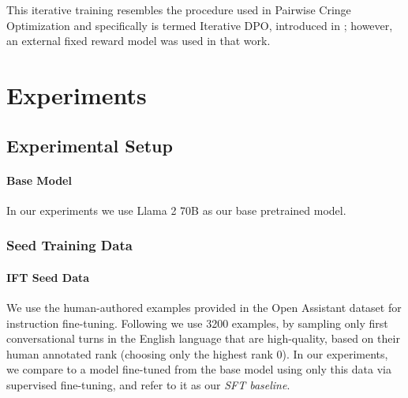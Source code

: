 \documentclass{article}
\begin{document}
This iterative training resembles the procedure used in Pairwise Cringe Optimization and specifically is termed  Iterative DPO,  introduced in \citet{xu2023some}; however, an external fixed reward model was used in that work.


\section{Experiments}

\subsection{Experimental Setup}

\paragraph{Base Model}
In our experiments we use Llama 2 70B \citep{touvron2023llama2} as our base pretrained model.

\subsubsection{Seed Training Data} \label{sec:seed_data}

\paragraph{IFT Seed Data}
We use the human-authored examples provided in the Open Assistant dataset \citep{kopf2023openassistant} for instruction fine-tuning. Following \citet{li2023self} we use 3200 examples,  by sampling  only first conversational turns in the English language that
are high-quality, based on their human annotated rank (choosing only the highest rank 0).
In our experiments, we compare to a model fine-tuned from the base model using only this data via supervised fine-tuning, and refer to it as our {\em SFT baseline}.
\end{document}
